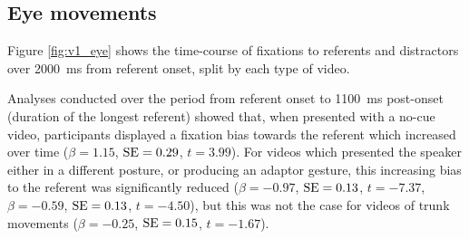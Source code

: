 \documentclass[a4paper,man,natbib]{apa6}
\newcommand{\resultsLM}[3]{$\beta = #1$, $\textnormal{SE} = #2$, $t #3$}
\begin{document}
\subsection{Eye movements}
Figure \ref{fig:v1_eye} shows the time-course of fixations to referents and distractors over 2000~ms from referent onset, split by each type of video.

Analyses conducted over the period from referent onset to 1100~ms post-onset (duration of the longest referent) showed that, when presented with a no-cue video, participants displayed a fixation bias towards the referent which increased over time (\resultsLM{1.15}{0.29}{=3.99}).
For videos which presented the speaker either in a different posture, or producing an adaptor gesture, this increasing bias to the referent was significantly reduced
(\resultsLM{-0.97}{0.13}{=-7.37}, \resultsLM{-0.59}{0.13}{=-4.50}), but this was not the case for videos of trunk movements (\resultsLM{-0.25}{0.15}{=-1.67}). 


\end{document}
